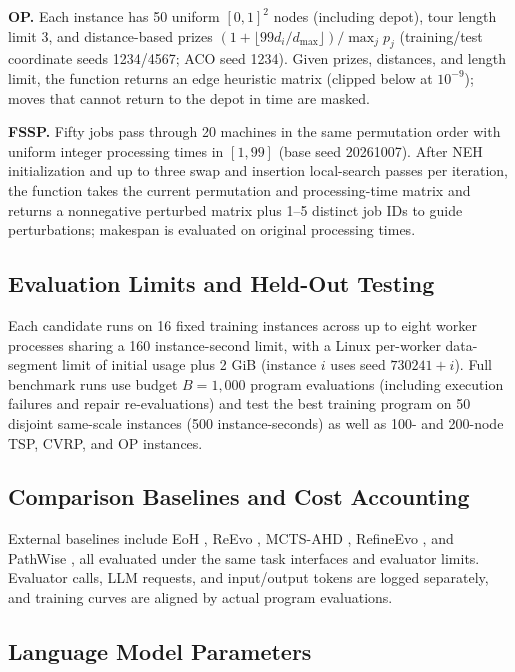 \documentclass{article}
\begin{document}
\textbf{OP.} Each instance has 50 uniform \([0,1]^2\) nodes (including depot), tour length limit 3, and distance-based prizes \((1+\lfloor99d_i/d_{\max}\rfloor)/\max_j p_j\) (training/test coordinate seeds 1234/4567; ACO seed 1234). Given prizes, distances, and length limit, the function returns an edge heuristic matrix (clipped below at \(10^{-9}\)); moves that cannot return to the depot in time are masked.

\textbf{FSSP.} Fifty jobs pass through 20 machines in the same permutation order with uniform integer processing times in \([1,99]\) (base seed 20261007). After NEH initialization and up to three swap and insertion local-search passes per iteration, the function takes the current permutation and processing-time matrix and returns a nonnegative perturbed matrix plus 1--5 distinct job IDs to guide perturbations; makespan is evaluated on original processing times.

\subsection{Evaluation Limits and Held-Out Testing}\label{evaluation-limits-and-held-out-testing}

Each candidate runs on 16 fixed training instances across up to eight worker processes sharing a 160 instance-second limit, with a Linux per-worker data-segment limit of initial usage plus 2 GiB (instance \(i\) uses seed \(730241+i\)). Full benchmark runs use budget \(B=1{,}000\) program evaluations (including execution failures and repair re-evaluations) and test the best training program on 50 disjoint same-scale instances (500 instance-seconds) as well as 100- and 200-node TSP, CVRP, and OP instances.

\subsection{Comparison Baselines and Cost Accounting}\label{comparison-baselines-and-cost-accounting}

External baselines include EoH \citep{eoh}, ReEvo \citep{reevo}, MCTS-AHD \citep{mctsahd}, RefineEvo \citep{refineevo}, and PathWise \citep{pathwise}, all evaluated under the same task interfaces and evaluator limits. Evaluator calls, LLM requests, and input/output tokens are logged separately, and training curves are aligned by actual program evaluations.

\subsection{Language Model Parameters}\label{language-model-parameters}
\end{document}
